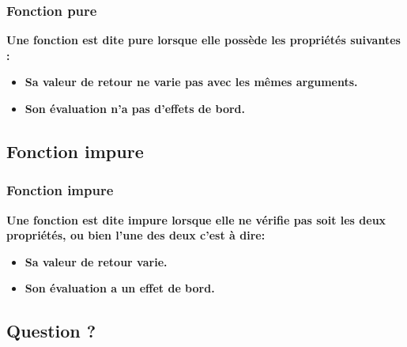 \documentclass[hyperref={bookmarks=false},aspectratio=169]{beamer}
\begin{document}

\begin{frame}
\frametitle{Fonction pure}
\textbf{Une fonction est dite pure lorsque elle possède les propriétés suivantes :}
\begin{itemize}
    \item  \textbf{Sa valeur de retour ne varie pas avec les mêmes arguments.}
    \item \textbf{Son évaluation n'a pas d'effets de bord.}
\end{itemize}


\end{frame}


\subsection{Fonction impure}



\begin{frame}
\frametitle{Fonction impure}

\textbf{Une fonction est dite impure lorsque elle ne vérifie pas soit les deux propriétés, ou bien l'une des deux c'est à dire:}

\begin{itemize}
    \item  \textbf{Sa valeur de retour  varie.}
    \item \textbf{Son évaluation a un effet de bord.}
\end{itemize}

\end{frame}

\subsection{Question ?}


\end{document}
